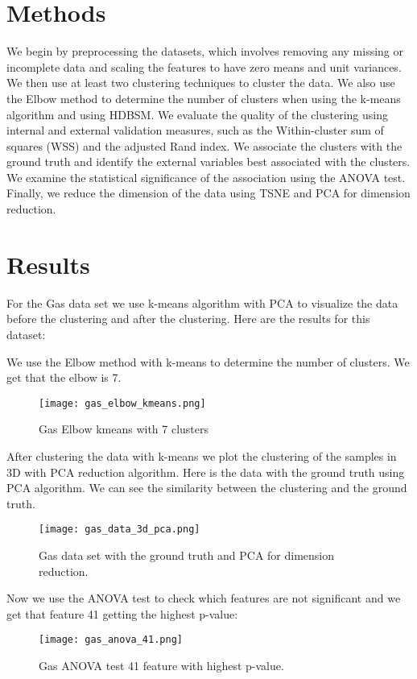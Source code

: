 \section{Methods}

We begin by preprocessing the datasets, which involves removing any missing or incomplete data and scaling the features to have zero means and unit variances. We then use at least two clustering techniques to cluster the data. We also use the Elbow method to determine the number of clusters when using the k-means algorithm and using HDBSM. We evaluate the quality of the clustering using internal and external validation measures, such as the Within-cluster sum of squares (WSS) and the adjusted Rand index. We associate the clusters with the ground truth and identify the external variables best associated with the clusters. We examine the statistical significance of the association using the ANOVA test. Finally, we reduce the dimension of the data using TSNE and PCA for dimension reduction.

\section{Results}

For the Gas data set we use k-means algorithm with PCA to visualize the data before the clustering and after the clustering. Here are the results for this dataset:



We use the Elbow method with k-means to determine the number of clusters. We get that the elbow is 7.
\begin{figure}[htp]
\centering
\texttt{[image: gas\_elbow\_kmeans.png]}
\caption{Gas Elbow kmeans with 7 clusters}
\label{fig:gas_elbow_kmeans}
\end{figure}

After clustering the data with k-means we plot the clustering of the samples in 3D with PCA reduction algorithm. Here is the data with the ground truth using PCA algorithm. We can see the similarity between the clustering and the ground truth.

\begin{figure}[htp]
\centering
\texttt{[image: gas\_data\_3d\_pca.png]}
\caption{Gas data set with the ground truth and PCA for dimension reduction.}
\label{fig:gas_data_3d_pca}
\end{figure}

Now we use the ANOVA test to check which features are not significant and we get that feature 41 getting the highest p-value:
\begin{figure}[htp]
\centering
\texttt{[image: gas\_anova\_41.png]}
\caption{Gas ANOVA test 41 feature with highest p-value.}
\label{fig:gas_anova_41}
\end{figure}

